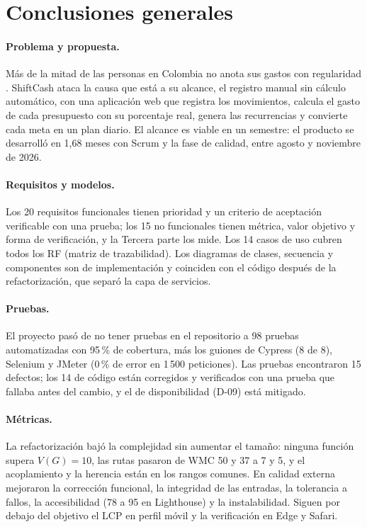 \section*{Conclusiones generales}

\paragraph{Problema y propuesta.} Más de la mitad de las personas en Colombia no anota sus gastos con regularidad \parencite{asobancaria2021}. ShiftCash ataca la causa que está a su alcance, el registro manual sin cálculo automático, con una aplicación web que registra los movimientos, calcula el gasto de cada presupuesto con su porcentaje real, genera las recurrencias y convierte cada meta en un plan diario. El alcance es viable en un semestre: el producto se desarrolló en 1,68 meses con Scrum y la fase de calidad, entre agosto y noviembre de 2026.

\paragraph{Requisitos y modelos.} Los 20 requisitos funcionales tienen prioridad y un criterio de aceptación verificable con una prueba; los 15 no funcionales tienen métrica, valor objetivo y forma de verificación, y la Tercera parte los mide. Los 14 casos de uso cubren todos los RF (matriz de trazabilidad). Los diagramas de clases, secuencia y componentes son de implementación y coinciden con el código después de la refactorización, que separó la capa de servicios.

\paragraph{Pruebas.} El proyecto pasó de no tener pruebas en el repositorio a 98 pruebas automatizadas con 95\,\% de cobertura, más los guiones de Cypress (8 de 8), Selenium y JMeter (0\,\% de error en 1\,500 peticiones). Las pruebas encontraron 15 defectos; los 14 de código están corregidos y verificados con una prueba que fallaba antes del cambio, y el de disponibilidad (D-09) está mitigado.

\paragraph{Métricas.} La refactorización bajó la complejidad sin aumentar el tamaño: ninguna función supera $V(G) = 10$, las rutas pasaron de WMC 50 y 37 a 7 y 5, y el acoplamiento y la herencia están en los rangos comunes. En calidad externa mejoraron la corrección funcional, la integridad de las entradas, la tolerancia a fallos, la accesibilidad (78 a 95 en Lighthouse) y la instalabilidad. Siguen por debajo del objetivo el LCP en perfil móvil y la verificación en Edge y Safari.

